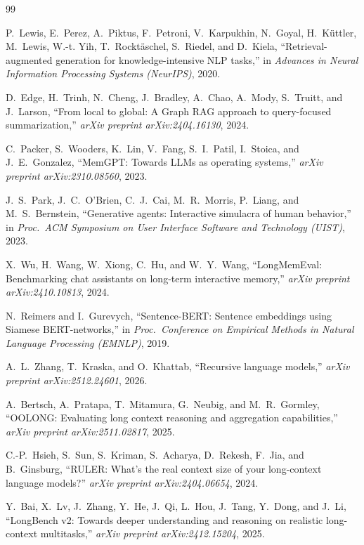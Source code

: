 \documentclass[conference]{IEEEtran}
\begin{document}
\begin{thebibliography}{99}

P.~Lewis, E.~Perez, A.~Piktus, F.~Petroni, V.~Karpukhin, N.~Goyal, H.~K\"{u}ttler,
M.~Lewis, W.-t. Yih, T.~Rockt\"{a}schel, S.~Riedel, and D.~Kiela,
``Retrieval-augmented generation for knowledge-intensive {NLP} tasks,''
in \emph{Advances in Neural Information Processing Systems (NeurIPS)}, 2020.

D.~Edge, H.~Trinh, N.~Cheng, J.~Bradley, A.~Chao, A.~Mody, S.~Truitt, and J.~Larson,
``From local to global: A {Graph RAG} approach to query-focused summarization,''
\emph{arXiv preprint arXiv:2404.16130}, 2024.

C.~Packer, S.~Wooders, K.~Lin, V.~Fang, S.~I.~Patil, I.~Stoica, and J.~E.~Gonzalez,
``{MemGPT}: Towards {LLMs} as operating systems,''
\emph{arXiv preprint arXiv:2310.08560}, 2023.

J.~S.~Park, J.~C.~O'Brien, C.~J.~Cai, M.~R.~Morris, P.~Liang, and M.~S.~Bernstein,
``Generative agents: Interactive simulacra of human behavior,''
in \emph{Proc.\ ACM Symposium on User Interface Software and Technology (UIST)}, 2023.

X.~Wu, H.~Wang, W.~Xiong, C.~Hu, and W.~Y.~Wang,
``{LongMemEval}: Benchmarking chat assistants on long-term interactive memory,''
\emph{arXiv preprint arXiv:2410.10813}, 2024.

N.~Reimers and I.~Gurevych,
``Sentence-{BERT}: Sentence embeddings using {Siamese BERT}-networks,''
in \emph{Proc.\ Conference on Empirical Methods in Natural Language Processing (EMNLP)},
2019.

A.~L.~Zhang, T.~Kraska, and O.~Khattab,
``Recursive language models,''
\emph{arXiv preprint arXiv:2512.24601}, 2026.

A.~Bertsch, A.~Pratapa, T.~Mitamura, G.~Neubig, and M.~R.~Gormley,
``{OOLONG}: Evaluating long context reasoning and aggregation capabilities,''
\emph{arXiv preprint arXiv:2511.02817}, 2025.

C.-P.~Hsieh, S.~Sun, S.~Kriman, S.~Acharya, D.~Rekesh, F.~Jia, and B.~Ginsburg,
``{RULER}: What's the real context size of your long-context language models?''
\emph{arXiv preprint arXiv:2404.06654}, 2024.

Y.~Bai, X.~Lv, J.~Zhang, Y.~He, J.~Qi, L.~Hou, J.~Tang, Y.~Dong, and J.~Li,
``{LongBench v2}: Towards deeper understanding and reasoning on realistic long-context
multitasks,''
\emph{arXiv preprint arXiv:2412.15204}, 2025.

\end{thebibliography}
\end{document}
